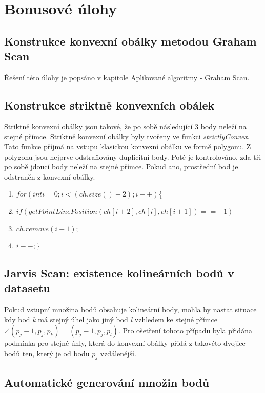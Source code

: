 \documentclass[a4paper, 12pt]{article}
\begin{document}
\section{Bonusové úlohy}

\subsection{Konstrukce konvexní obálky metodou Graham Scan}
Řešení této úlohy je popsáno v kapitole Aplikované algoritmy - Graham Scan.

\subsection{Konstrukce striktně konvexních obálek}
Striktně konvexní obálky jsou takové, že po sobě následující 3 body neleží na stejné přímce. Striktně konvexní obálky byly tvořeny ve funkci \textit{strictlyConvex}. Tato funkce příjmá na vstupu klasickou konvexní obálku ve formě polygonu. Z polygonu jsou nejprve odstraňovány duplicitní body. Poté je kontrolováno, zda tři po sobě jdoucí body neleží na stejné přímce. Pokud ano, prostřední bod je odstraněn z konvexní obálky.

\begin{enumerate}
\item $ for(int i=0; i<(ch.size()-2); i++)$\{
\item $     if(getPointLinePosition(ch[i+2],ch[i],ch[i+1])==-1)$
\item $         ch.remove(i+1);$
\item $         i--;$\}
\end{enumerate}

\subsection{Jarvis Scan: existence kolineárních bodů v datasetu}
Pokud vstupní množina bodů obsahuje kolineární body, mohla by nastat situace kdy bod \textit{k} má stejný úhel jako jiný bod \textit{l} vzhledem ke stejné přímce $\angle (p_j-1, p_j, p_k)=(p_j-1, p_j, p_l)$. Pro ošetření tohoto případu byla přidána podmínka pro stejné úhly, která do konvexní obálky přidá z takovéto dvojice bodů ten, který je od bodu $p_j$ vzdálenější. 

\subsection{Automatické generování množin bodů}
\end{document}
